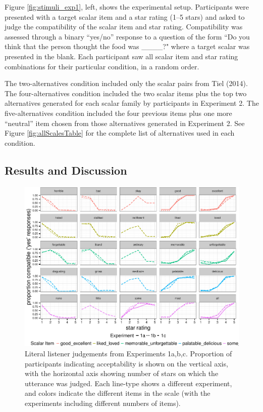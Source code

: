 \documentclass[10pt, letterpaper]{article}
\newenvironment{CodeChunk}{}{}
\begin{document}
Figure \ref{fig:stimuli_exp1}, left, shows the experimental setup.
Participants were presented with a target scalar item and a star rating
(1--5 stars) and asked to judge the compatibility of the scalar item and
star rating. Compatibility was assessed through a binary ``yes/no''
response to a question of the form ``Do you think that the person
thought the food was \_\_\_\_?" where a target scalar was presented in
the blank. Each participant saw all scalar item and star rating
combinations for their particular condition, in a random order.

The two-alternatives condition included only the scalar pairs from Tiel
(2014). The four-alternatives condition included the two scalar items
plus the top two alternatives generated for each scalar family by
participants in Experiment 2. The five-alternatives condition included
the four previous items plus one more ``neutral'' item chosen from those
alternatives generated in Experiment 2. See Figure
\ref{fig:allScalesTable} for the complete list of alternatives used in
each condition.

\subsection{Results and Discussion}\label{results-and-discussion}

\begin{CodeChunk}
\begin{figure}[t]

{\centering \includegraphics{figs/exp1Plots-1} 

}

\caption[Literal listener judgements from Experiments 1a,b,c]{Literal listener judgements from Experiments 1a,b,c. Proportion of participants indicating acceptability is shown on the vertical axis, with the horizontal axis showing number of stars on which the utterance was judged. Each line-type shows a different experiment, and colors indicate the different items in the scale (with the experiments including different numbers of items).}\label{fig:exp1Plots}
\end{figure}
\end{CodeChunk}
\end{document}
